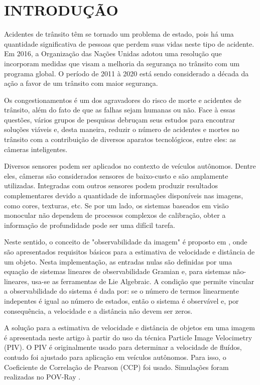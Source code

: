 \section{INTRODUÇÃO}

Acidentes de trânsito têm se tornado um problema de estado, pois há uma quantidade significativa de pessoas que
perdem suas vidas neste tipo de acidente. Em 2016, a Organização das Nações Unidas adotou uma resolução que incorporam medidas que visam 
a melhoria da segurança no trânsito com um programa global. O período de 2011 à 2020 está sendo considerado a década da ação a favor
de um trânsito com maior segurança.

Os congestionamentos é um dos agravadores do risco de morte e acidentes de trânsito, além do fato de que as falhas sejam humanas ou não. 
Face à essas questões, vários grupos de pesquisas debruçam seus estudos para encontrar soluções viáveis e, desta maneira,
reduzir o número de acidentes e mortes no trânsito com a contribuição de diversos aparatos tecnológicos, entre eles: as câmeras inteligentes.


Diversos sensores podem ser aplicados no contexto de veículos autônomos. Dentre eles, 
câmeras são considerados sensores de baixo-custo e são amplamente utilizadas. 
Integradas com outros sensores podem produzir resultados complementares devido a 
quantidade de informações disponíveis nas imagens, como cores, texturas, etc. 
Se por um lado, os sistemas baseados em visão monocular não dependem de processos 
complexos de calibração, obter a informação de profundidade pode ser uma difícil 
tarefa.


Neste sentido, o conceito de "observabilidade da imagem" é proposto em \cite{Breugel}, onde são apresentados requisitos básicos para a estimativa de velocidade e 
distância de um objeto. Nesta implementação, as entradas nulas são definidas por uma equação de sistemas lineares de observabilidade Gramian e,
para sistemas não-lineares, usa-se as ferramentas de Lie Algebraic. A condição que permite vincular a observabilidade do sistema é dada por:
se o número de termos linearmente indepentes é igual ao número de estados, então o sistema é observável e, por consequência, a velocidade e a 
distância não devem ser zeros.

A solução para a estimativa de velocidade e distância de objetos em uma imagem é 
apresentada neste artigo à partir do uso da técnica Particle Image Velocimetry (PIV). 
O PIV é originalmente usado para determinar a velocidade de fluídos, contudo foi 
ajustado para aplicação em veículos autônomos. Para isso, o Coeficiente de 
Correlação de Pearson (CCP) \cite{Miranda Neto} foi usado. Simulações foram realizadas no POV-Ray \cite{povray}.




















